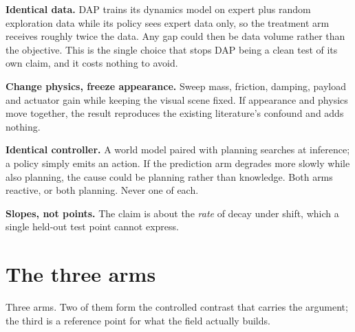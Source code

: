 \documentclass[9pt]{extarticle}
\begin{document}
\textbf{Identical data.} DAP trains its dynamics model on expert plus random exploration data while its policy sees expert data only, so the treatment arm receives roughly twice the data. Any gap could then be data volume rather than the objective. This is the single choice that stops DAP being a clean test of its own claim, and it costs nothing to avoid.

\textbf{Change physics, freeze appearance.} Sweep mass, friction, damping, payload and actuator gain while keeping the visual scene fixed. If appearance and physics move together, the result reproduces the existing literature's confound and adds nothing.

\textbf{Identical controller.} A world model paired with planning searches at inference; a policy simply emits an action. If the prediction arm degrades more slowly while also planning, the cause could be planning rather than knowledge. Both arms reactive, or both planning. Never one of each.

\textbf{Slopes, not points.} The claim is about the \emph{rate} of decay under shift, which a single held-out test point cannot express.

\section{The three arms}

Three arms. Two of them form the controlled contrast that carries the argument; the third is a reference point for what the field actually builds.
\end{document}
